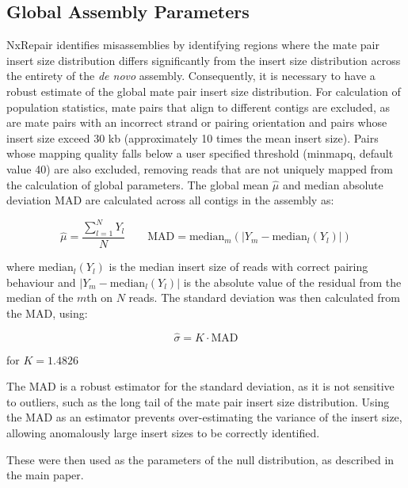 \documentclass[fleqn,10pt]{wlpeerj}
\begin{document}
\subsection*{Global Assembly Parameters}
NxRepair identifies misassemblies by identifying regions where the mate pair insert size distribution differs significantly from the insert size distribution across the entirety of the \textit{de novo} assembly. Consequently, it is necessary to have a robust estimate of the global mate pair insert size distribution. For calculation of population statistics, mate pairs that align to different contigs are excluded, as are mate pairs with an incorrect strand or pairing orientation and pairs whose insert size exceed 30 kb (approximately 10 times the mean insert size). Pairs whose mapping quality falls below a user specified threshold (minmapq, default value 40) are also excluded, removing reads that are not uniquely mapped from the calculation of global parameters. The global mean $\hat{\mu}$ and median absolute deviation $\text{MAD}$ are calculated across all contigs in the assembly as:

\begin{equation}
\hat{\mu} = \frac{\sum_{l=1}^N Y_l}{N} \qquad \text{MAD} = \text{median}_m(|Y_m - \text{median}_l(Y_l)|)
\label{eq:global}
\end{equation}

where $\text{median}_l(Y_l)$ is the median insert size of reads with correct pairing behaviour and $|Y_m - \text{median}_l(Y_l)|$ is the absolute value of the residual from the median of the $m$th on $N$ reads. The standard deviation was then calculated from the MAD, using:

\begin{equation}
\hat{\sigma} = K \cdot \text{MAD}
\label{eq:mad_to_sigma}
\end{equation}

for $K = 1.4826$

The $\text{MAD}$ is a robust estimator for the standard deviation, as it is not sensitive to outliers, such as the long tail of the mate pair insert size distribution. Using the MAD as an estimator prevents over-estimating the variance of the insert size, allowing anomalously large insert sizes to be correctly identified.

These were then used as the parameters of the null distribution, as described in the main paper.
\end{document}
